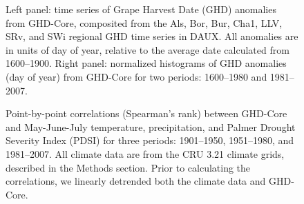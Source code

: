 \documentclass[final]{nature}
\begin{document}

\begin{figure}
\caption{Left panel: time series of Grape Harvest Date (GHD) anomalies from GHD-Core, composited from the Als, Bor, Bur, Cha1, LLV, SRv, and SWi regional GHD time series in DAUX. All anomalies are in units of day of year, relative to the average date calculated from 1600--1900. Right panel: normalized histograms of GHD anomalies (day of year) from GHD-Core for two periods: 1600--1980 and 1981--2007.}
\end{figure}

\begin{figure}
\caption{Point-by-point correlations (Spearman's rank) between GHD-Core and May-June-July temperature, precipitation, and Palmer Drought Severity Index (PDSI) for three periods: 1901--1950, 1951--1980, and 1981--2007. All climate data are from the CRU 3.21 climate grids, described in the Methods section. Prior to calculating the correlations, we linearly detrended both the climate data and GHD-Core.}
\end{figure}
\end{document}

